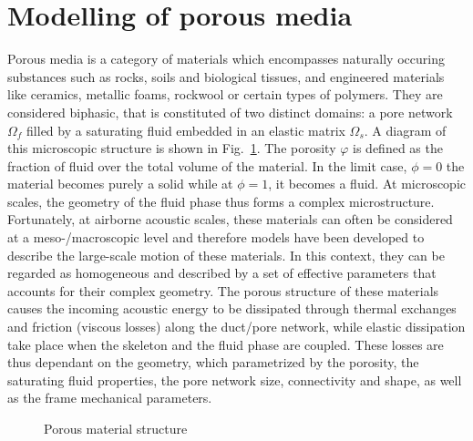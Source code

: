 \newpage 

\section{Modelling of porous media}
\label{sec:porous_models}
Porous media is a category of materials which encompasses naturally occuring substances such as rocks, soils and biological tissues, and engineered materials like ceramics, metallic foams, rockwool or certain types of polymers. They are considered biphasic, that is constituted of two distinct domains: a pore network $\Omega_f$ filled by a saturating fluid embedded in an elastic matrix $\Omega_s$. A diagram of this microscopic structure is shown in Fig.~\ref{fig:poro_struct}. The porosity $\varphi$ is defined as the fraction of fluid over the total volume of the material. In the limit case, $\phi = 0$ the material becomes purely a solid while at $\phi = 1$, it becomes a fluid. At microscopic scales, the geometry of the fluid phase thus forms a complex microstructure. Fortunately, at airborne acoustic scales, these materials can often be considered at a meso-/macroscopic level and therefore models have been developed to describe the large-scale motion of these materials. In this context, they can be regarded as homogeneous and described by a set of effective parameters that accounts for their complex geometry. The porous structure of these materials causes the incoming acoustic energy to be dissipated through thermal exchanges and friction (viscous losses) along the duct/pore network, while elastic dissipation take place when the skeleton and the fluid phase are coupled. These losses are thus dependant on the geometry, which parametrized by the porosity, the saturating fluid properties, the pore network size, connectivity and shape, as well as the frame mechanical parameters. 
\begin{figure}[htpb]
    \centering
    
    \caption{Porous material structure}
    \label{fig:poro_struct}
\end{figure}
